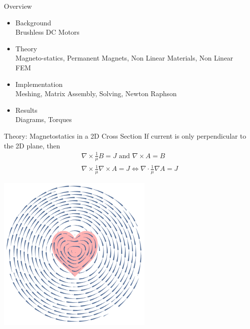 \documentclass{beamer}
\begin{document}
    \begin{frame}{Overview}
        \begin{itemize}
            \item {\large Background}\\
            Brushless DC Motors
            \item {\large Theory}\\
            Magneto-statics, Permanent Magnets, Non Linear Materials, Non Linear FEM
            \item {\large Implementation}\\
            Meshing, Matrix Assembly, Solving, Newton Raphson
            \item {\large Results}\\
            Diagrams, Torques
        \end{itemize}

    \end{frame}
    \begin{frame}{Theory: Magnetostatics in a 2D Cross Section}
        If current is only perpendicular to the 2D plane, then
        \begin{align*}
            &\nabla\times \frac{1}{\mu}B=J\text{ and }\nabla \times A = B\\
            &\nabla\times \frac{1}{\mu}\nabla\times A=J \iff \nabla\cdot \frac{1}{\mu}\nabla A=J
        \end{align*}
        \begin{center}
            \includegraphics[width=3in]{heartwire.pdf}
        \end{center}
    \end{frame}
\end{document}
